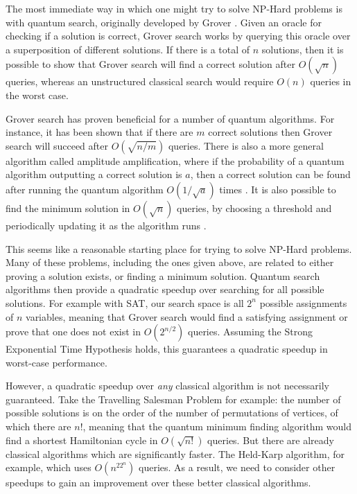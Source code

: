 The most immediate way in which one might try to solve NP-Hard problems is with quantum search, originally developed by Grover \cite{grover96}. Given an oracle for checking if a solution is correct, Grover search works by querying this oracle over a superposition of different solutions. If there is a total of $n$ solutions, then it is possible to show that Grover search will find a correct solution after $O(\sqrt{n})$ queries, whereas an unstructured classical search would require $O(n)$ queries in the worst case.

Grover search has proven beneficial for a number of quantum algorithms. For instance, it has been shown that if there are $m$ correct solutions then Grover search will succeed after $O(\sqrt{n/m})$ queries. There is also a more general algorithm called amplitude amplification, where if the probability of a quantum algorithm outputting a correct solution is $a$, then a correct solution can be found after running the quantum algorithm $O(1/\sqrt{a})$ times \cite{brassard2002}. It is also possible to find the minimum solution in $O(\sqrt{n})$ queries, by choosing a threshold and periodically updating it as the algorithm runs \cite{durr1996}.

This seems like a reasonable starting place for trying to solve NP-Hard problems. Many of these problems, including the ones given above, are related to either proving a solution exists, or finding a minimum solution. Quantum search algorithms then provide a quadratic speedup over searching for all possible solutions. For example with SAT, our search space is all $2^n$ possible assignments of $n$ variables, meaning that Grover search would find a satisfying assignment or prove that one does not exist in $O(2^{n/2})$ queries. Assuming the Strong Exponential Time Hypothesis holds, this guarantees a quadratic speedup in worst-case performance.

However, a quadratic speedup over \textit{any} classical algorithm is not necessarily guaranteed. Take the Travelling Salesman Problem for example: the number of possible solutions is on the order of the number of permutations of vertices, of which there are $n!$, meaning that the quantum minimum finding algorithm would find a shortest Hamiltonian cycle in $O(\sqrt{n!})$ queries. But there are already classical algorithms which are significantly faster. The Held-Karp algorithm, for example, which uses $O(n^22^n)$ queries. As a result, we need to consider other speedups to gain an improvement over these better classical algorithms.

